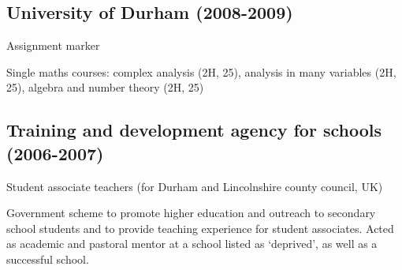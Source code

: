 \documentclass[letterpaper]{article}
\renewenvironment{itemize}{
  \begin{list}{}{
    \setlength{\leftmargin}{1.5em}
  }
}{
  \end{list}
}
\begin{document}

\subsection*{University of Durham (2008-2009)}
\begin{itemize}
\item Assignment marker
\begin{itemize}
	\item[--] Single maths courses: complex analysis (2H, 25), analysis in many
	variables (2H, 25), algebra and number theory (2H, 25)
\end{itemize}
\end{itemize}


\subsection*{Training and development agency for schools (2006-2007)}
\begin{itemize}
	\item Student associate teachers (for Durham and Lincolnshire county
	council, UK)
\begin{itemize}
	\item[--] Government scheme to promote higher education and outreach to
	secondary school students and to provide teaching experience for student
	associates. Acted as academic and pastoral mentor at a school listed as
	`deprived', as well as a successful school.
\end{itemize}
\end{itemize}

\end{document}
